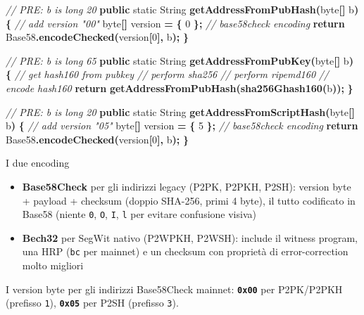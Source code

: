 \documentclass[
  italian,
  openany]{book}
\newenvironment{Shaded}{\begin{snugshade}}{\end{snugshade}}
\newcommand{\BuiltInTok}[1]{#1}
\newcommand{\CommentTok}[1]{\textcolor[rgb]{0.56,0.35,0.01}{\textit{#1}}}
\newcommand{\ControlFlowTok}[1]{\textcolor[rgb]{0.13,0.29,0.53}{\textbf{#1}}}
\newcommand{\DataTypeTok}[1]{\textcolor[rgb]{0.13,0.29,0.53}{#1}}
\newcommand{\DecValTok}[1]{\textcolor[rgb]{0.00,0.00,0.81}{#1}}
\newcommand{\FunctionTok}[1]{\textcolor[rgb]{0.13,0.29,0.53}{\textbf{#1}}}
\newcommand{\KeywordTok}[1]{\textcolor[rgb]{0.13,0.29,0.53}{\textbf{#1}}}
\newcommand{\NormalTok}[1]{#1}
\newcommand{\OperatorTok}[1]{\textcolor[rgb]{0.81,0.36,0.00}{\textbf{#1}}}
\providecommand{\tightlist}{%
  \setlength{\itemsep}{0pt}\setlength{\parskip}{0pt}}
\begin{document}
\begin{Shaded}
\begin{Highlighting}[]
\CommentTok{// PRE: b is long 20}
\KeywordTok{public} \DataTypeTok{static} \BuiltInTok{String} \FunctionTok{getAddressFromPubHash}\OperatorTok{(}\DataTypeTok{byte}\OperatorTok{[]}\NormalTok{ b}\OperatorTok{)} \OperatorTok{\{}
    \CommentTok{// add version "00"}
    \DataTypeTok{byte}\OperatorTok{[]}\NormalTok{ version }\OperatorTok{=} \OperatorTok{\{} \DecValTok{0} \OperatorTok{\};}
    \CommentTok{// base58check encoding}
    \ControlFlowTok{return}\NormalTok{ Base58}\OperatorTok{.}\FunctionTok{encodeChecked}\OperatorTok{(}\NormalTok{version}\OperatorTok{[}\DecValTok{0}\OperatorTok{],}\NormalTok{ b}\OperatorTok{);}
\OperatorTok{\}}

\CommentTok{// PRE: b is long 65}
\KeywordTok{public} \DataTypeTok{static} \BuiltInTok{String} \FunctionTok{getAddressFromPubKey}\OperatorTok{(}\DataTypeTok{byte}\OperatorTok{[]}\NormalTok{ b}\OperatorTok{)} \OperatorTok{\{}
    \CommentTok{// get hash160 from pubkey}
    \CommentTok{// perform sha256}
    \CommentTok{// perform ripemd160}
    \CommentTok{// encode hash160}
    \ControlFlowTok{return} \FunctionTok{getAddressFromPubHash}\OperatorTok{(}\FunctionTok{sha256Ghash160}\OperatorTok{(}\NormalTok{b}\OperatorTok{));}
\OperatorTok{\}}

\CommentTok{// PRE: b is long 20}
\KeywordTok{public} \DataTypeTok{static} \BuiltInTok{String} \FunctionTok{getAddressFromScriptHash}\OperatorTok{(}\DataTypeTok{byte}\OperatorTok{[]}\NormalTok{ b}\OperatorTok{)} \OperatorTok{\{}
    \CommentTok{// add version "05"}
    \DataTypeTok{byte}\OperatorTok{[]}\NormalTok{ version }\OperatorTok{=} \OperatorTok{\{} \DecValTok{5} \OperatorTok{\};}
    \CommentTok{// base58check encoding}
    \ControlFlowTok{return}\NormalTok{ Base58}\OperatorTok{.}\FunctionTok{encodeChecked}\OperatorTok{(}\NormalTok{version}\OperatorTok{[}\DecValTok{0}\OperatorTok{],}\NormalTok{ b}\OperatorTok{);}
\OperatorTok{\}}
\end{Highlighting}
\end{Shaded}

\begin{callouttip}{I due encoding}

\begin{itemize}
\tightlist
\item
  \textbf{Base58Check} per gli indirizzi legacy (P2PK, P2PKH, P2SH):
  version byte + payload + checksum (doppio SHA-256, primi 4 byte), il
  tutto codificato in Base58 (niente \texttt{0}, \texttt{O}, \texttt{I},
  \texttt{l} per evitare confusione visiva)
\item
  \textbf{Bech32} per SegWit nativo (P2WPKH, P2WSH): include il witness
  program, una HRP (\texttt{bc} per mainnet) e un checksum con proprietà
  di error-correction molto migliori
\end{itemize}

I version byte per gli indirizzi Base58Check mainnet:
\textbf{\texttt{0x00}} per P2PK/P2PKH (prefisso \texttt{1}),
\textbf{\texttt{0x05}} per P2SH (prefisso \texttt{3}).

\end{callouttip}
\end{document}
